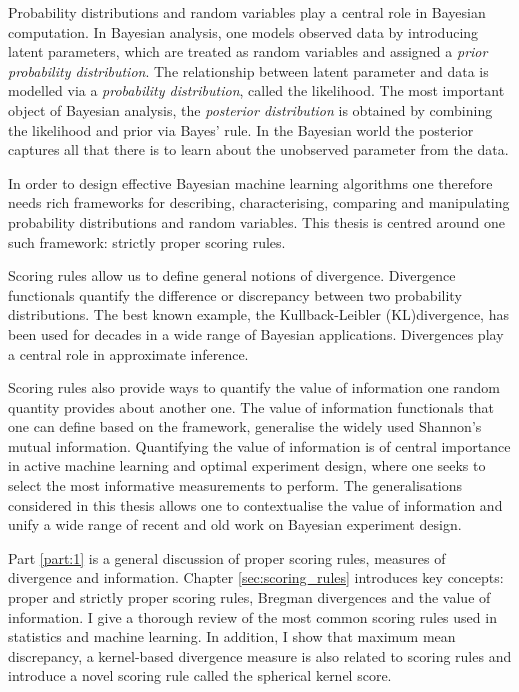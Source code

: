 
Probability distributions and random variables play a central role in Bayesian computation. In Bayesian analysis, one models observed data by introducing latent parameters, which are treated as random variables and assigned a \emph{prior probability distribution}. The relationship between latent parameter and data is modelled via a \emph{probability distribution}, called the likelihood. The most important object of Bayesian analysis, the  \emph{posterior distribution} is obtained by combining the likelihood and prior via Bayes' rule. In the Bayesian world the posterior captures all that there is to learn about the unobserved parameter from the data.

In order to design effective Bayesian machine learning algorithms one therefore needs rich frameworks for describing, characterising, comparing and manipulating probability distributions and random variables. This thesis is centred around one such framework: strictly proper scoring rules.

Scoring rules allow us to define general notions of divergence. Divergence functionals quantify the difference or discrepancy between two probability distributions. The best known example, the Kullback-Leibler (KL)divergence, has been used for decades in a wide range of Bayesian applications. Divergences play a central role in approximate inference.

Scoring rules also provide ways to quantify the value of information one random quantity provides about another one. The value of information functionals that one can define based on the framework, generalise the widely used Shannon's mutual information. Quantifying the value of information is of central importance in active machine learning and optimal experiment design, where one seeks to select the most informative measurements to perform. The generalisations considered in this thesis allows one to contextualise the value of information and unify a wide range of recent and old work on Bayesian experiment design.

Part \ref{part:1} is a general discussion of proper scoring rules, measures of divergence and information. Chapter \ref{sec:scoring_rules} introduces key concepts: proper and strictly proper scoring rules, Bregman divergences and the value of information. I give a thorough review of the most common scoring rules used in statistics and machine learning. In addition, I show that maximum mean discrepancy, a kernel-based divergence measure is also related to scoring rules and introduce a novel scoring rule called the spherical kernel score.

